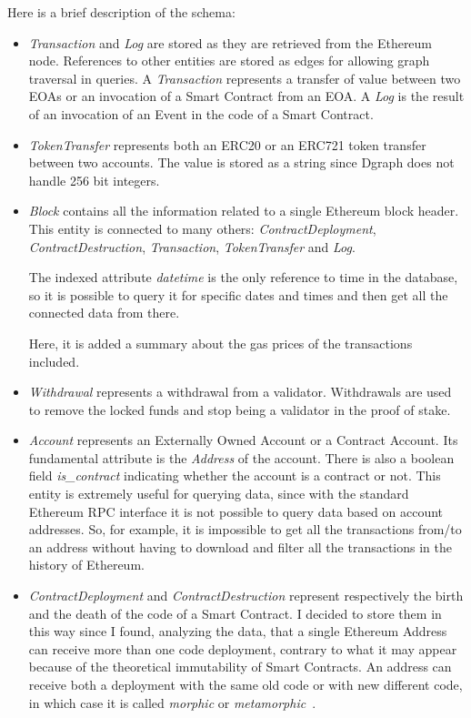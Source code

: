 \noindent Here is a brief description of the schema:

\begin{itemize}

    \item \textit{Transaction} and \textit{Log} are stored as they are retrieved from the Ethereum node. References to other entities are stored as edges for allowing graph traversal in queries. A \textit{Transaction} represents a transfer of value between two EOAs or an invocation of a Smart Contract from an EOA. A \textit{Log} is the result of an invocation of an Event in the code of a Smart Contract.

    \item \textit{TokenTransfer} represents both an ERC20 or an ERC721 token transfer between two accounts. The value is stored as a string since Dgraph does not handle 256 bit integers.
    
    \item \textit{Block} contains all the information related to a single Ethereum block header. This entity is connected to many others: \textit{ContractDeployment}, \textit{ContractDestruction}, \textit{Transaction}, \textit{TokenTransfer} and \textit{Log}. 
    
    The indexed attribute \textit{datetime} is the only reference to time in the database, so it is possible to query it for specific dates and times and then get all the connected data from there. 

    Here, it is added a summary about the gas prices of the transactions included.

    \item \textit{Withdrawal} represents a withdrawal from a validator. Withdrawals are used to remove the locked funds and stop being a validator in the proof of stake.

    \item \textit{Account} represents an Externally Owned Account or a Contract Account. Its fundamental attribute is the \textit{Address} of the account. There is also a boolean field \textit{is\_contract} indicating whether the account is a contract or not. This entity is extremely useful for querying data, since with the standard Ethereum RPC interface it is not possible to query data based on account addresses. So, for example, it is impossible to get all the transactions from/to an address without having to download and filter all the transactions in the history of Ethereum.

    \item \textit{ContractDeployment} and \textit{ContractDestruction} represent respectively the birth and the death of the code of a Smart Contract. I decided to store them in this way since I found, analyzing the data, that a single Ethereum Address can receive more than one code deployment, contrary to what it may appear because of the theoretical immutability of Smart Contracts. An address can receive both a deployment with the same old code or with new different code, in which case it is called \textit{morphic} or \textit{metamorphic}~\cite{create2-metamorphic}.


\end{itemize}
